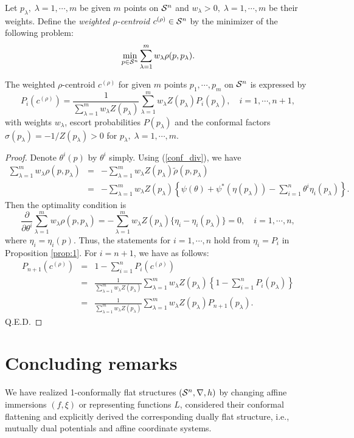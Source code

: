 \documentclass{llncs}
\begin{document}
Let $p_\lambda, \; \lambda=1, \cdots, m$ be given $m$ points 
on ${\cal S}^n$ and $w_\lambda > 0, \; \lambda=1, \cdots, m$ be their weights.
Define the {\em weighted $\rho$-centroid} $c^{(\rho)} \in {\cal S}^n$ by 
the minimizer of the following problem:
\[
	\min_{p \in {\cal S}^n} 
		\sum_{\lambda=1}^m w_\lambda \rho(p,p_\lambda).
\]
\begin{theorem}
The weighted $\rho$-centroid $c^{(\rho)}$ for given $m$ points 
$p_1, \cdots, p_m$ on ${\cal S}^n$ is expressed by 
\[
	P_i(c^{(\rho)})= \frac{1}{\sum_{\lambda=1}^m w_\lambda Z(p_\lambda)} 
		\sum_{\lambda=1}^m w_\lambda Z(p_\lambda) P_i(p_\lambda), 
		\quad i=1,\cdots,n+1,
\]
with weights $w_\lambda$, escort probabilities $P(p_\lambda)$ and 
the conformal factors $\sigma(p_\lambda)=-1/Z(p_\lambda)>0$ 
for $p_\lambda, \; \lambda=1,\cdots,m$.
\end{theorem}
\begin{proof}
Denote $\theta^i(p)$ by $\theta^i$ simply. Using (\ref{conf_div}), 
we have
\begin{eqnarray*}
	\sum_{\lambda=1}^m w_\lambda \rho(p,p_\lambda)
	&=&-\sum_{\lambda=1}^m w_\lambda Z(p_\lambda)
		\tilde \rho(p,p_\lambda) \\
	&=&-\sum_{\lambda=1}^m w_\lambda Z(p_\lambda)\left\{\psi(\theta)
	+\psi^*(\eta(p_\lambda))
	-\sum_{i=1}^n \theta^i \eta_i(p_\lambda)\right\}.
\end{eqnarray*}
Then the optimality condition is 
\[
	\frac{\partial}{\partial \theta^i} 
	\sum_{\lambda=1}^m w_\lambda \rho(p,p_\lambda)
	= -\sum_{\lambda=1}^m w_\lambda Z(p_\lambda)
	\{\eta_i-\eta_i(p_\lambda)\}=0, 
	\quad i=1,\cdots, n,
\]
where $\eta_i=\eta_i(p)$.
Thus, the statements for $i=1,\cdots,n$ hold from $\eta_i=P_i$ in 
Proposition \ref{prop:1}.
For $i=n+1$, we have as follows:
\begin{eqnarray*}
	P_{n+1}(c^{(\rho)})&=&1-\sum_{i=1}^n P_i(c^{(\rho)}) \\
	&=&\frac{1}{\sum_{\lambda=1}^m w_\lambda Z(p_\lambda)} 
		\sum_{\lambda=1}^m w_\lambda Z(p_\lambda) 
		\left\{1-\sum_{i=1}^n P_i(p_\lambda) \right\}\\
	&=&\frac{1}{\sum_{\lambda=1}^m w_\lambda Z(p_\lambda)} 
		\sum_{\lambda=1}^m w_\lambda Z(p_\lambda) P_{n+1}(p_\lambda).
\end{eqnarray*}
\hfill Q.E.D.
\end{proof}

\section{Concluding remarks}
We have realized 1-conformally flat structures $({\cal S}^n,\nabla,h)$ by 
changing affine immersions $(f,\xi)$ or representing functions $L$, 
considered their conformal flattening and explicitly derived 
the corresponding dually flat structure, 
i.e., mutually dual potentials and affine coordinate systems.
\end{document}
